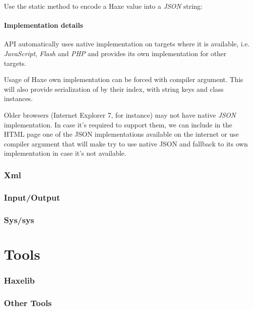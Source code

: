\documentclass{haxe}
\begin{document}
Use the  static method to encode a Haxe value into a \emph{JSON} string:

\subsection{Implementation details}
\label{std-Json-implementation-details}

 API automatically uses native implementation on targets where it is available, i.e. \emph{JavaScript}, \emph{Flash} and \emph{PHP} and provides its own implementation for other targets.

Usage of Haxe own implementation can be forced with  compiler argument. This will also provide serialization of  by their index,  with string keys and class instances.

Older browsers (Internet Explorer 7, for instance) may not have native \emph{JSON} implementation. In case it's required to support them, we can include in the HTML page one of the JSON implementations available on the internet or use  compiler argument that will make  try to use native JSON and fallback to its own implementation in case it's not available.

\section{Xml}
\label{std-Xml}

\section{Input/Output}
\label{std-input-output}

\section{Sys/sys}
\label{std-sys}

\part{Tools}

\section{Haxelib}
\label{tools-haxelib}

\section{Other Tools}
\label{tools-other}
\end{document}
